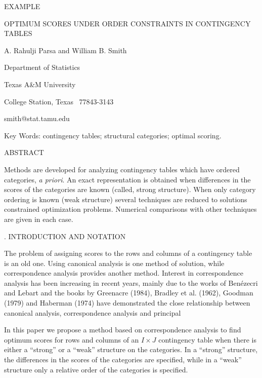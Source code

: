 \documentclass[12pt]{article}
\begin{document}
%
%
\centerline{EXAMPLE}
\vskip 3mm


\noindent OPTIMUM SCORES UNDER ORDER CONSTRAINTS
IN CONTINGENCY TABLES
\vskip 3mm


\vskip 5mm
\noindent A. Rahulji Parsa and William B. Smith

\noindent Department of Statistics

\noindent Texas A\&M University

\noindent College Station, Texas \ 77843-3143

\noindent smith@stat.tamu.edu

\vskip 3mm
\noindent Key Words: contingency tables; structural categories; optimal scoring.
\vskip 3mm


\noindent ABSTRACT


%
Methods are developed for analyzing contingency tables which have
ordered categories, {\it a priori}.  An exact representation is obtained
when differences in the scores of the categories are known  (called, strong
structure).  When   only category ordering is known (weak structure) several techniques are reduced to solutions constrained optimization problems.  Numerical comparisons with other techniques are given in each case.
%
\vskip 4mm


.   INTRODUCTION AND NOTATION



The problem of assigning scores to the rows and columns of a
contingency table is an old one.  Using canonical analysis is one
method of solution, while correspondence analysis provides another
method.  Interest in correspondence analysis has been increasing in
recent years, mainly due to the works of Ben\'ezecri and Lebart and the
books by Greenacre (1984), Bradley et al. (1962), Goodman (1979) and Haberman (1974) 
have demonstrated the close relationship between canonical analysis, 
correspondence analysis and principal 

In this paper we propose a method based on correspondence analysis to
find optimum scores for rows and columns of an $I\times J$
contingency table when there is either a ``strong'' or a ``weak''
structure on the categories.  In a ``strong'' structure, the differences in the scores of the categories are specified, while in a ``weak'' structure only a relative order of the categories is specified.
\end{document}
